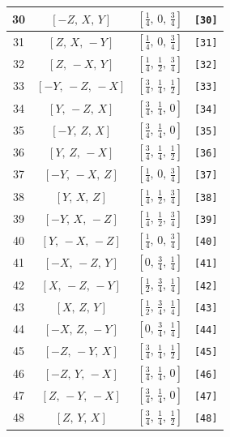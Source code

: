 \documentclass[fleqn,8pt]{jsarticle}
\begin{document}
\begin{longtable}{cccc}
30 & $\left[ - Z,\, X,\, Y \right]$ & $\left[ \frac{1}{4},\, 0,\, \frac{3}{4} \right]$ & {\tt [30]} \\ \hline
31 & $\left[ Z,\, X,\, - Y \right]$ & $\left[ \frac{1}{4},\, 0,\, \frac{3}{4} \right]$ & {\tt [31]} \\ \hline
32 & $\left[ Z,\, - X,\, Y \right]$ & $\left[ \frac{1}{4},\, \frac{1}{2},\, \frac{3}{4} \right]$ & {\tt [32]} \\ \hline
33 & $\left[ - Y,\, - Z,\, - X \right]$ & $\left[ \frac{3}{4},\, \frac{1}{4},\, \frac{1}{2} \right]$ & {\tt [33]} \\ \hline
34 & $\left[ Y,\, - Z,\, X \right]$ & $\left[ \frac{3}{4},\, \frac{1}{4},\, 0 \right]$ & {\tt [34]} \\ \hline
35 & $\left[ - Y,\, Z,\, X \right]$ & $\left[ \frac{3}{4},\, \frac{1}{4},\, 0 \right]$ & {\tt [35]} \\ \hline
36 & $\left[ Y,\, Z,\, - X \right]$ & $\left[ \frac{3}{4},\, \frac{1}{4},\, \frac{1}{2} \right]$ & {\tt [36]} \\ \hline
37 & $\left[ - Y,\, - X,\, Z \right]$ & $\left[ \frac{1}{4},\, 0,\, \frac{3}{4} \right]$ & {\tt [37]} \\ \hline
38 & $\left[ Y,\, X,\, Z \right]$ & $\left[ \frac{1}{4},\, \frac{1}{2},\, \frac{3}{4} \right]$ & {\tt [38]} \\ \hline
39 & $\left[ - Y,\, X,\, - Z \right]$ & $\left[ \frac{1}{4},\, \frac{1}{2},\, \frac{3}{4} \right]$ & {\tt [39]} \\ \hline
40 & $\left[ Y,\, - X,\, - Z \right]$ & $\left[ \frac{1}{4},\, 0,\, \frac{3}{4} \right]$ & {\tt [40]} \\ \hline
41 & $\left[ - X,\, - Z,\, Y \right]$ & $\left[ 0,\, \frac{3}{4},\, \frac{1}{4} \right]$ & {\tt [41]} \\ \hline
42 & $\left[ X,\, - Z,\, - Y \right]$ & $\left[ \frac{1}{2},\, \frac{3}{4},\, \frac{1}{4} \right]$ & {\tt [42]} \\ \hline
43 & $\left[ X,\, Z,\, Y \right]$ & $\left[ \frac{1}{2},\, \frac{3}{4},\, \frac{1}{4} \right]$ & {\tt [43]} \\ \hline
44 & $\left[ - X,\, Z,\, - Y \right]$ & $\left[ 0,\, \frac{3}{4},\, \frac{1}{4} \right]$ & {\tt [44]} \\ \hline
45 & $\left[ - Z,\, - Y,\, X \right]$ & $\left[ \frac{3}{4},\, \frac{1}{4},\, \frac{1}{2} \right]$ & {\tt [45]} \\ \hline
46 & $\left[ - Z,\, Y,\, - X \right]$ & $\left[ \frac{3}{4},\, \frac{1}{4},\, 0 \right]$ & {\tt [46]} \\ \hline
47 & $\left[ Z,\, - Y,\, - X \right]$ & $\left[ \frac{3}{4},\, \frac{1}{4},\, 0 \right]$ & {\tt [47]} \\ \hline
48 & $\left[ Z,\, Y,\, X \right]$ & $\left[ \frac{3}{4},\, \frac{1}{4},\, \frac{1}{2} \right]$ & {\tt [48]} \\
\end{longtable}
\end{document}
